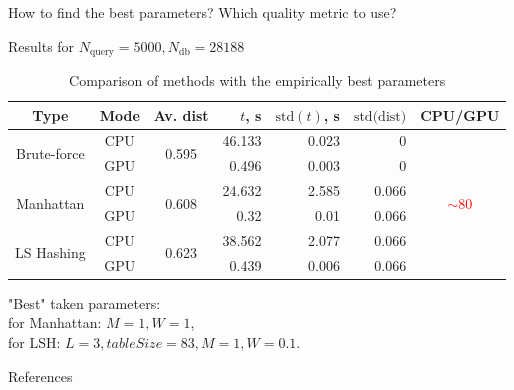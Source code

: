 \documentclass[aspectratio=169]{beamer}
\begin{document}
\begin{frame}{How to find the best parameters? Which quality metric to use?}
\end{frame}


\begin{frame}{Results for $N_{\text{query}} = 5000, N_{\text{db}} = 28188$}

\begin{table}[]
\hspace{1.5cm}
\begin{tabular}{|c|c|c|r|r|r|c|}
	\hline
	Type & Mode & Av. dist & $t$, s &  \small $\text{std}(t)$, s & \small$\text{std(dist)}$ &  \small CPU/GPU\\ \hline
	
	\multirow{2}{*}{Brute-force}& CPU & \multirow{2}{*}{0.595} &  46.133 & 0.023 & 0 & \multirow{6}{*}{\textcolor{red}{$\sim80$}} \\ 
	& GPU & & 0.496 & 0.003 & 0  & \\ \cline{1-6}
	
	\multirow{2}{*}{Manhattan} & CPU & \multirow{2}{*}{0.608} & 24.632 & 2.585 & 0.066 & \\ 
	& GPU  & & 0.32 & 0.01 & 0.066 & \\ \cline{1-6}
	
	\multirow{2}{*}{LS Hashing} & CPU & \multirow{2}{*}{0.623} & 38.562  &2.077 & 0.066 &  \\ 
	& GPU &  & 0.439 & 0.006 & 0.066 & \\ \hline
\end{tabular}
\caption {Comparison of methods with the empirically best parameters}
\end{table}
"Best" taken parameters:\\
for Manhattan: $M=1, W=1$,\\
for LSH: $L=3, tableSize=83, M=1, W=0.1$.
\end{frame}

\begin{frame}[allowframebreaks]{References}
\printbibliography
\end{frame}
\end{document}
